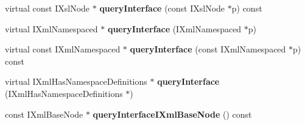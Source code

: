 \begin{DoxyCompactItemize}
\item 
\hypertarget{classgeneral__server_1_1XmlBaseNode_a2088c40c52ca409fdf8af3e935f43930}{virtual const \-I\-Xsl\-Node $\ast$ {\bfseries query\-Interface} (const \-I\-Xsl\-Node $\ast$p) const }\label{classgeneral__server_1_1XmlBaseNode_a2088c40c52ca409fdf8af3e935f43930}

\item 
\hypertarget{classgeneral__server_1_1XmlBaseNode_af9a2886ce0f274868b5b5e91bee6bc54}{virtual \-I\-Xml\-Namespaced $\ast$ {\bfseries query\-Interface} (\-I\-Xml\-Namespaced $\ast$p)}\label{classgeneral__server_1_1XmlBaseNode_af9a2886ce0f274868b5b5e91bee6bc54}

\item 
\hypertarget{classgeneral__server_1_1XmlBaseNode_acf7bcd60b0c430cdbd3d4b709f2a8ba7}{virtual const \-I\-Xml\-Namespaced $\ast$ {\bfseries query\-Interface} (const \-I\-Xml\-Namespaced $\ast$p) const }\label{classgeneral__server_1_1XmlBaseNode_acf7bcd60b0c430cdbd3d4b709f2a8ba7}

\item 
\hypertarget{classgeneral__server_1_1XmlBaseNode_a92f106512536cb3adb206193db477bf9}{virtual \*
\-I\-Xml\-Has\-Namespace\-Definitions $\ast$ {\bfseries query\-Interface} (\-I\-Xml\-Has\-Namespace\-Definitions $\ast$)}\label{classgeneral__server_1_1XmlBaseNode_a92f106512536cb3adb206193db477bf9}

\item 
\hypertarget{classgeneral__server_1_1XmlBaseNode_a58ef03ba90769f6e967bee4fa93bbe28}{const \-I\-Xml\-Base\-Node $\ast$ {\bfseries query\-Interface\-I\-Xml\-Base\-Node} () const }\label{classgeneral__server_1_1XmlBaseNode_a58ef03ba90769f6e967bee4fa93bbe28}

\end{DoxyCompactItemize}
